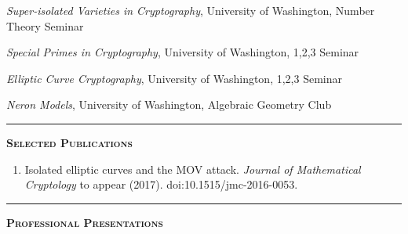 \documentclass[12pt]{article}
\newcommand{\sectionheading}[1]
{
\bigskip %
\noindent
\hspace{-6.5mm}\textcolor{Gray}{\rule[.75mm]{21.5mm}{1mm}} %
\hspace{.2mm}	%
{\large{\textbf{\textsc{#1}}}} %
}
\newenvironment{date_section}
	{
	\vspace{-1ex}
	\leftmargini = 15ex
		\begin{itemize}[
			labelsep = *,
			labelwidth = 9ex,
			labelindent = 0ex,
			itemindent = !,
			font=\normalfont,
			align=parleft
		]{}
		\itemsep=-1.5mm
	}
	{\end{itemize}\vspace{-2ex}}
\newcommand{\yearmo}[2]{
	\item[
		{\makebox[1ex][r]{#1}}
		\hspace{1ex}
		{\makebox[1ex][l]{#2} }
		] }
\begin{document}
		\begin{date_section}

			\yearmo{2017}{May.} %
				\emph{Super-isolated Varieties in Cryptography},
				University of Washington,
				Number Theory Seminar

			\yearmo{2016}{Nov.} %
				\emph{Special Primes in Cryptography},
				University of Washington,
				1,2,3 Seminar

			\yearmo{2015}{Nov.} %
				\emph{Elliptic Curve Cryptography},
				University of Washington,
				1,2,3 Seminar
			
			\yearmo{2015}{Aug.} %
				\emph{Neron Models},
				University of Washington,
				Algebraic Geometry Club
			
%
%

		\end{date_section}

	\sectionheading{Selected Publications}%
	
	\vspace{-2ex}
	
	\begin{enumerate}[itemsep=-1mm, leftmargin=24mm]

		\item
		{Isolated elliptic curves and the MOV attack.}
		\textit{Journal of Mathematical Cryptology} to appear (2017). doi:10.1515/jmc-2016-0053.

	\end{enumerate}

	\sectionheading{Professional Presentations}%
\end{document}
